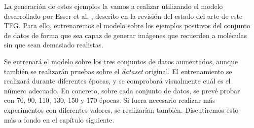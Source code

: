 
La generación de estos ejemplos la vamos a realizar utilizando el modelo desarrollado por Esser et al. \cite{esser2021taming}, descrito en la revisión del estado del arte de este TFG. Para ello, entrenaremos el modelo sobre los ejemplos positivos del conjunto de datos de forma que sea capaz de generar imágenes que recuerden a moléculas sin que sean demasiado realistas. 

Se entrenará el modelo sobre los tres conjuntos de datos aumentados, aunque también se realizarán pruebas sobre el \textit{dataset} original. El entrenamiento se realizará durante diferentes épocas, y se comprobará visualmente cuál es el número adecuado. En concreto, sobre cada conjunto de datos, se prevé probar con 70, 90, 110, 130, 150 y 170 épocas. Si fuera necesario realizar más experimentos con diferentes valores, se realizarían también. Discutiremos esto más a fondo en el capítulo siguiente.

